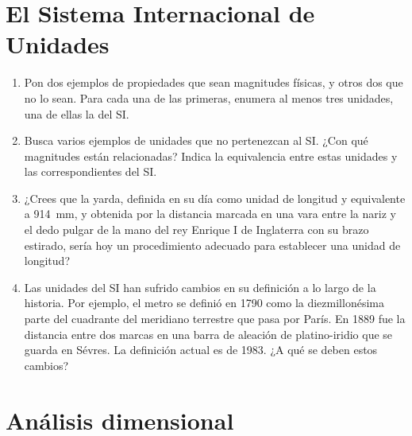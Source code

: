 \documentclass[
]{article}
\author{}
\date{}
\begin{document}
\hypertarget{el-sistema-internacional-de-unidades}{%
\section{El Sistema Internacional de
Unidades}\label{el-sistema-internacional-de-unidades}}

\begin{enumerate}
\def\labelenumi{\arabic{enumi}.}
\item
  Pon dos ejemplos de propiedades que sean magnitudes físicas, y otros
  dos que no lo sean. Para cada una de las primeras, enumera al menos
  tres unidades, una de ellas la del SI.
\item
  Busca varios ejemplos de unidades que no pertenezcan al SI. ¿Con qué
  magnitudes están relacionadas? Indica la equivalencia entre estas
  unidades y las correspondientes del SI.
\item
  ¿Crees que la yarda, definida en su día como unidad de longitud y
  equivalente a 914~mm, y obtenida por la distancia marcada en una vara
  entre la nariz y el dedo pulgar de la mano del rey Enrique I de
  Inglaterra con su brazo estirado, sería hoy un procedimiento adecuado
  para establecer una unidad de longitud?
\item
  Las unidades del SI han sufrido cambios en su definición a lo largo de
  la historia. Por ejemplo, el metro se definió en 1790 como la
  diezmillonésima parte del cuadrante del meridiano terrestre que pasa
  por París. En 1889 fue la distancia entre dos marcas en una barra de
  aleación de platino-iridio que se guarda en Sévres. La definición
  actual es de 1983. ¿A qué se deben estos cambios?
\end{enumerate}

\hypertarget{analisis-dimensional}{%
\section{Análisis dimensional}\label{analisis-dimensional}}
\end{document}

